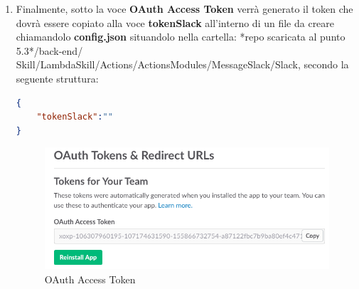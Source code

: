 \documentclass[../ManualeSviluppatore_v1.0.0.tex]{subfiles}
\begin{document}
\begin{enumerate}
				\item Finalmente, sotto la voce \textbf{OAuth Access Token} verrà generato il token che dovrà essere copiato alla voce \textbf{tokenSlack} all'interno di un file da creare chiamandolo \textbf{config.json} situandolo nella cartella: *repo scaricata al punto 5.3*/back-end/ Skill/LambdaSkill/Actions/ActionsModules/MessageSlack/Slack, secondo la seguente struttura:
				\begin{lstlisting}[language=json,firstnumber=1]
{
	"tokenSlack":""
}
				\end{lstlisting}
				\begin{figure}[!h]
					\centering
					\includegraphics[scale=0.54]{Screenshot/OAuth.png}
					\caption{OAuth Access Token}
				\end{figure}
			\end{enumerate}
\end{document}
